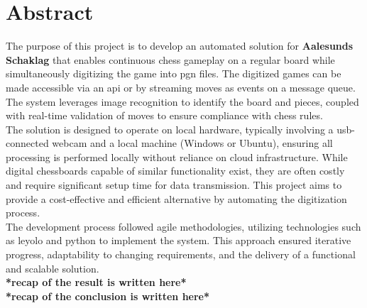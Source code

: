 \chapter*{Abstract}


The purpose of this project is to develop an automated solution for \textbf{Aalesunds Schaklag} that enables continuous chess gameplay on a regular board while simultaneously digitizing the game into \gls{pgn} files. The digitized games can be made accessible via an \gls{api} or by streaming moves as events on a message queue. The system leverages image recognition to identify the board and pieces, coupled with real-time validation of moves to ensure compliance with chess rules.\\

The solution is designed to operate on local hardware, typically involving a \acrshort{usb}-connected webcam and a local machine (Windows or Ubuntu), ensuring all processing is performed locally without reliance on cloud infrastructure. While digital chessboards capable of similar functionality exist, they are often costly and require significant setup time for data transmission. This project aims to provide a cost-effective and efficient alternative by automating the digitization process.\\

The development process followed \gls{agile} methodologies, utilizing technologies such as \acrshort{leyolo} and \gls{python} to implement the system. This approach ensured iterative progress, adaptability to changing requirements, and the delivery of a functional and scalable solution.\\

\textbf{*recap of the result is written here*}\\

\textbf{*recap of the conclusion is written here*}